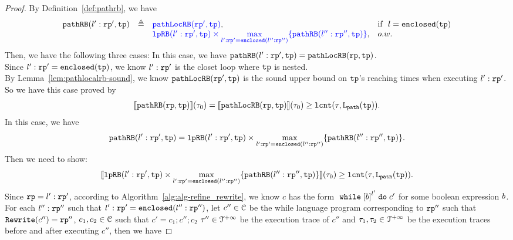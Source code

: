 \begin{proof}
By Definition~\ref{def:pathrb}, we have 
\[  
  \begin{array}{rcll}
  \inoutB(l': \rprog', \tpath) & \triangleq & 
  \highlight{\outinB(\rprog', \tpath)}, & \text{if }~ l = \kw{enclosed}(\tpath)
  \\ &  & 
  \highlight{
    \lpchB(l':\rprog', \tpath )
  \times \max\limits_{l': \rprog' = \kw{enclosed}(l'':\rprog'')}
  \{\inoutB(l'':\rprog'', \tpath)\} }, & o.w.
  \end{array}
\]
%
Then, we have the following three cases:
In this case, we have $\mathtt{pathRB}(l': \mathtt{rp}', \mathtt{tp}) = {\mathtt{pathLocRB}(\mathtt{rp}, \mathtt{tp})}$.
\\
Since $l': \mathtt{rp}' = \mathtt{enclosed}(\mathtt{tp})$, we know $l': \mathtt{rp}'$ is the closet loop where $\mathtt{tp}$ is nested.
\\
By Lemma~\ref{lem:pathlocalrb-sound}, we know $\mathtt{pathLocRB}(\mathtt{rp}', \mathtt{tp})$ is the
sound upper bound on $\mathtt{tp}$'s reaching times when executing $l': \mathtt{rp}'$. 
\\
So we have this case proved by
\[
  \llbracket \mathtt{pathRB}(\mathtt{rp}, \mathtt{tp}) \rrbracket(\mathtt{\tau}_0) = \llbracket \mathtt{pathLocRB}(\mathtt{rp}, \mathtt{tp}) \rrbracket(\mathtt{\tau}_0) \geq \mathtt{lcnt}(\mathtt{\tau}, \mathtt{L}_{\mathtt{path}}(\mathtt{tp})).
\]
%
In this case, we have 
\[
  \mathtt{pathRB}(l': \mathtt{rp}', \mathtt{tp}) = \mathtt{lpRB}(l':\mathtt{rp}', \mathtt{tp} )
  \times \max\limits_{l': \mathtt{rp}' = \mathtt{enclosed}(l'':\mathtt{rp}'')}
  \{\mathtt{pathRB}(l'':\mathtt{rp}'', \mathtt{tp})\}.
\]
Then we need to show:
\[
  \llbracket \mathtt{lpRB}(l':\mathtt{rp}', \mathtt{tp} )
  \times \max\limits_{l': \mathtt{rp}' = \mathtt{enclosed}(l'':\mathtt{rp}'')}
  \{\mathtt{pathRB}(l'':\mathtt{rp}'', \mathtt{tp})\} \rrbracket(\mathtt{\tau}_0) 
  \geq \mathtt{lcnt}(\mathtt{\tau}, \mathtt{L}_{\mathtt{path}}(\mathtt{tp})).
  \]
%
Since $\mathtt{rp} = l': \mathtt{rp}'$, according to Algorithm~\ref{alg:alg-refine_rewrite}, we know $c$ has the form
$\ewhile \clabel{\bexpr}^{l'} \edo c'$ for some boolean expression $b$.
\\
For each $l'':\mathtt{rp}''$ such that $l': \mathtt{rp}' = \mathtt{enclosed}(l'':\mathtt{rp}'')$, 
let $c''\in \mathcal{C}$ be the while language program corresponding to $\mathtt{rp}''$ such that $\mathtt{Rewrite}(c'') = \mathtt{rp}''$,
$c_1, c_2 \in \mathcal{C}$ such that $c' = c_1; c''; c_2$
$\mathtt{\tau}'' \in \mathcal{T}^{+\infty}$ be the execution trace of $c''$ and $\mathtt{\tau}_1, \mathtt{\tau}_2 \in \mathcal{T}^{+\infty}$ be the execution traces before and after executing $c''$, then we have

\end{proof}
